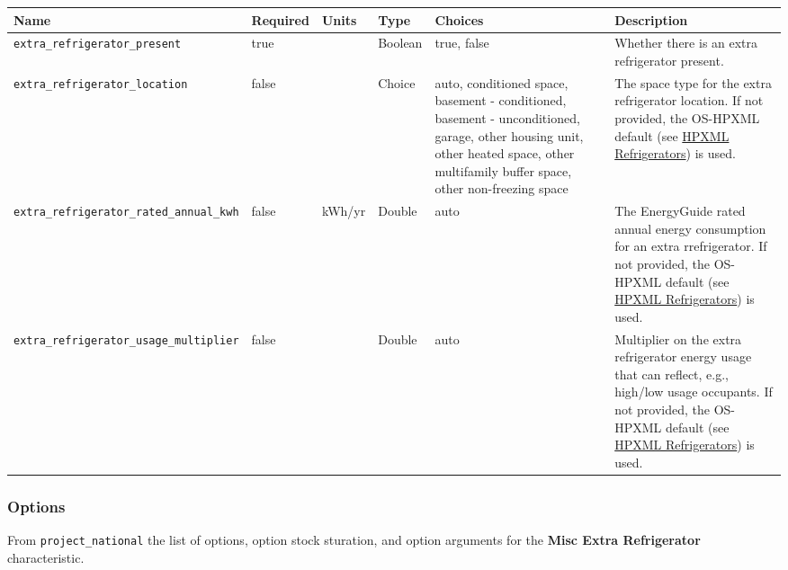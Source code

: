 \begin{longtable}[]{@{}llllll@{}}
\toprule\noalign{}
Name & Required & Units & Type & Choices & Description \\
\midrule\noalign{}
\endhead
\bottomrule\noalign{}
\endlastfoot
\texttt{extra\_refrigerator\_present} & true & & Boolean & true, false &
Whether there is an extra refrigerator present. \\
\texttt{extra\_refrigerator\_location} & false & & Choice & auto,
conditioned space, basement - conditioned, basement - unconditioned,
garage, other housing unit, other heated space, other multifamily buffer
space, other non-freezing space & The space type for the extra
refrigerator location. If not provided, the OS-HPXML default (see
\href{https://openstudio-hpxml.readthedocs.io/en/v1.7.0/workflow_inputs.html\#hpxml-refrigerators}{HPXML
Refrigerators}) is used. \\
\texttt{extra\_refrigerator\_rated\_annual\_kwh} & false & kWh/yr &
Double & auto & The EnergyGuide rated annual energy consumption for an
extra rrefrigerator. If not provided, the OS-HPXML default (see
\href{https://openstudio-hpxml.readthedocs.io/en/v1.7.0/workflow_inputs.html\#hpxml-refrigerators}{HPXML
Refrigerators}) is used. \\
\texttt{extra\_refrigerator\_usage\_multiplier} & false & & Double &
auto & Multiplier on the extra refrigerator energy usage that can
reflect, e.g., high/low usage occupants. If not provided, the OS-HPXML
default (see
\href{https://openstudio-hpxml.readthedocs.io/en/v1.7.0/workflow_inputs.html\#hpxml-refrigerators}{HPXML
Refrigerators}) is used. \\
\end{longtable}

\subsubsection{Options}\label{options-114}

From \texttt{project\_national} the list of options, option stock
sturation, and option arguments for the \textbf{Misc Extra Refrigerator}
characteristic.

